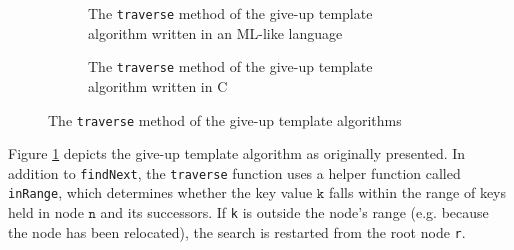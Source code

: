 \documentclass[a4paper,UKenglish,cleveref, autoref, thm-restate]{lipics-v2021}
\begin{document}
\begin{figure}[!ht]
	\begin{subfigure}[t]{0.45\textwidth}
		 
		\caption{The \lstinline{traverse} method of the give-up template algorithm written in an ML-like language}
		\label{traverse_giveup_a}	
	\end{subfigure}\qquad
	\begin{subfigure}[t]{0.48\textwidth}
		 
		\caption{The \lstinline{traverse} method of the give-up template algorithm written in C}
		\label{traverse_giveup_b}
	\end{subfigure}
	\caption{The \lstinline{traverse} method of the give-up template algorithms}
	\label{traverse_giveup}
\end{figure}

Figure \ref{traverse_giveup_a} depicts the give-up template algorithm as originally presented. In addition to \lstinline{findNext}, the \lstinline{traverse} function uses a helper function called \lstinline{inRange}, which determines whether the key value $\texttt{k}$ falls within the range of keys held in node $\texttt{n}$ and its successors. If \lstinline{k} is outside the node's range (e.g. because the node has been relocated), the search is restarted from the root node \lstinline{r}.
\end{document}
